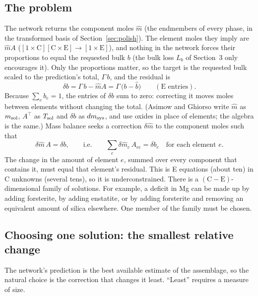 \documentclass[11pt]{article}
\begin{document}
\subsection{The problem}
\label{sec:mb-problem}

The network returns the component moles $\hat m$ (the endmembers of every phase, in the
transformed basis of Section~\ref{sec:polish}). The element moles they imply are $\hat m A$
($[1\times\text{C}][\text{C}\times\text{E}] \to [1\times\text{E}]$), and nothing in the
network forces their proportions to equal the requested bulk $b$ (the bulk loss $L_b$ of
Section~3 only encourages it). Only the proportions matter, so the target is the requested
bulk scaled to the prediction's total, $\Gamma\, b$, and the residual is
\begin{equation}
  \delta b = \Gamma\, b - \hat m A = \Gamma\,\big(b - \hat b\big)
  \qquad (\text{E entries}).
  \label{eq:mbr}
\end{equation}
Because $\sum_e b_e = 1$, the entries of $\delta b$ sum to zero: correcting it moves moles
between elements without changing the total. (Asimow and Ghiorso write $\hat m$ as
$m_{\rm sol}$, $A^{\!\top}$ as $T_{\rm sol}$ and $\delta b$ as $dm_{\rm sys}$, and use oxides
in place of elements; the algebra is the same.) Mass balance seeks a correction
$\delta\hat m$ to the component moles such that
\begin{equation}
  \delta\hat m\, A = \delta b,
  \qquad\text{i.e.}\qquad
  \sum_c \delta\hat m_c\, A_{ce} = \delta b_e \quad \text{for each element } e .
  \label{eq:mbcond}
\end{equation}
The change in the amount of element $e$, summed over every component that contains it,
must equal that element's residual. This is E equations (about ten) in C unknowns (several
tens), so it is underconstrained. There is a $(\text{C} - \text{E})$-dimensional family of
solutions. For example, a deficit in Mg can be made up by adding forsterite, by adding
enstatite, or by adding forsterite and removing an equivalent amount of silica elsewhere.
One member of the family must be chosen.

\subsection{Choosing one solution: the smallest relative change}
\label{sec:mb-objective}

The network's prediction is the best available estimate of the assemblage, so the natural
choice is the correction that changes it least. ``Least'' requires a measure of size.
\end{document}
